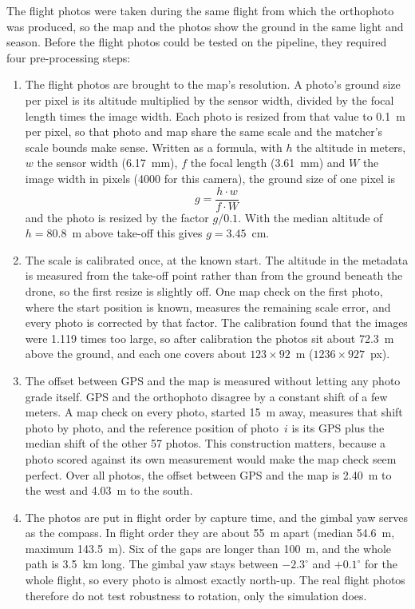 \documentclass[english, Lau, oneside]{sapthesis}%
\begin{document}
The flight photos were taken during the same flight from which the orthophoto was produced, so the map and the photos show the ground in the same light and season. Before the flight photos could be tested on the pipeline, they required four pre-processing steps:

\begin{enumerate}
\item The flight photos are brought to the map's resolution. A photo's ground size per pixel is its altitude multiplied by the sensor width, divided by the focal length times the image width. Each photo is resized from that value to 0.1~m per pixel, so that photo and map share the same scale and the matcher's scale bounds make sense. Written as a formula, with $h$ the altitude in meters, $w$ the sensor width (6.17~mm), $f$ the focal length (3.61~mm) and $W$ the image width in pixels (4000 for this camera), the ground size of one pixel is
\begin{equation}
  g = \frac{h \cdot w}{f \cdot W}
  \label{eq:gsd}
\end{equation}
and the photo is resized by the factor $g / 0.1$. With the median altitude of $h = 80.8$~m above take-off this gives $g = 3.45$~cm.

\item The scale is calibrated once, at the known start. The altitude in the metadata is measured from the take-off point rather than from the ground beneath the drone, so the first resize is slightly off. One map check on the first photo, where the start position is known, measures the remaining scale error, and every photo is corrected by that factor. The calibration found that the images were 1.119 times too large, so after calibration the photos sit about 72.3~m above the ground, and each one covers about $123 \times 92$~m ($1236 \times 927$~px).

\item The offset between GPS and the map is measured without letting any photo grade itself. GPS and the orthophoto disagree by a constant shift of a few meters. A map check on every photo, started 15~m away, measures that shift photo by photo, and the reference position of photo~$i$ is its GPS plus the median shift of the other 57 photos. This construction matters, because a photo scored against its own measurement would make the map check seem perfect. Over all photos, the offset between GPS and the map is 2.40~m to the west and 4.03~m to the south.

\item The photos are put in flight order by capture time, and the gimbal yaw serves as the compass. In flight order they are about 55~m apart (median 54.6~m, maximum 143.5~m). Six of the gaps are longer than 100~m, and the whole path is 3.5~km long. The gimbal yaw stays between $-2.3^\circ$ and $+0.1^\circ$ for the whole flight, so every photo is almost exactly north-up. The real flight photos therefore do not test robustness to rotation, only the simulation does.
\end{enumerate}
\end{document}
